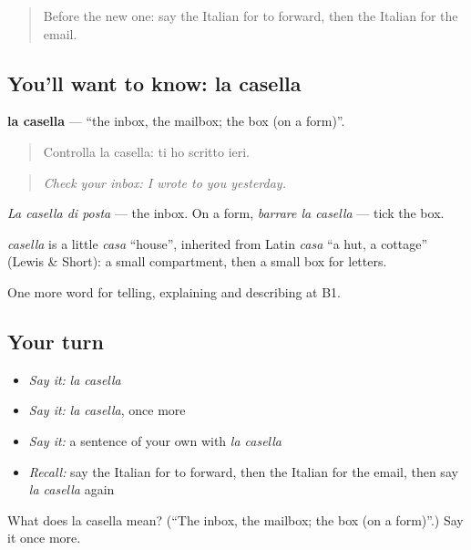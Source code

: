 \label{lesson:IT-C403-casella}



\begin{quote}
Before the new one: say the Italian for to forward, then the Italian for the email.
\end{quote}

\subsection*{You'll want to know: la casella}
\textbf{la casella} — \textquotedblleft{}the inbox, the mailbox; the box (on a form)\textquotedblright{}.

\begin{quote}
Controlla la casella: ti ho scritto ieri.
\end{quote}

\begin{quote}
\emph{Check your inbox: I wrote to you yesterday.}
\end{quote}

\emph{La casella di posta} — the inbox. On a form, \emph{barrare la casella} — tick the box.

\begin{cousinweb}
\emph{casella} is a little \emph{casa} \textquotedblleft{}house\textquotedblright{}, inherited from Latin \emph{casa} \textquotedblleft{}a hut, a cottage\textquotedblright{} (Lewis \& Short): a small compartment, then a small box for letters.
\end{cousinweb}

\begin{grammarlens}[title={What you've built}]
One more word for telling, explaining and describing at B1.
\end{grammarlens}

\subsection*{Your turn}
\begin{itemize}
\raggedright
  \item \emph{Say it:} \emph{la casella}
  \item \emph{Say it:} \emph{la casella}, once more
  \item \emph{Say it:} a sentence of your own with \emph{la casella}
  \item \emph{Recall:} say the Italian for to forward, then the Italian for the email, then say \emph{la casella} again
\end{itemize}

\begin{tcolorbox}[breakable,colback=teal!4,colframe=teal!35!black,title={Before you move on}]
What does la casella mean? (\textquotedblleft{}The inbox, the mailbox; the box (on a form)\textquotedblright{}.) Say it once more.
\end{tcolorbox}
